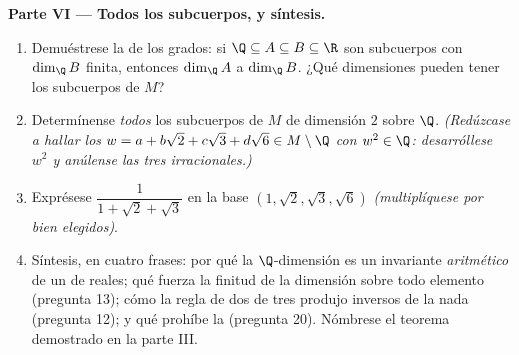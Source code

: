 \begin{problem}
\medskip
\noindent\textbf{Parte VI --- Todos los subcuerpos, y síntesis.}
\begin{enumerate}[resume]
  \item Demuéstrese la  de los grados: si
        $\Q \subseteq A \subseteq B \subseteq \R$ son subcuerpos con
        $\dim_\Q B$ finita, entonces $\dim_\Q A$  a
        $\dim_\Q B$. ¿Qué dimensiones pueden tener los subcuerpos de
        $M$?
  \item Determínense \emph{todos} los subcuerpos de $M$ de dimensión
        $2$ sobre $\Q$. \emph{(Redúzcase a hallar los $w = a +
        b\sqrt2 + c\sqrt3 + d\sqrt6 \in M \setminus \Q$ con
        $w^2 \in \Q$: desarróllese $w^2$ y anúlense las tres
         irracionales.)}
  \item Exprésese $\dfrac1{1 + \sqrt2 + \sqrt3}$ en la base
        $(1, \sqrt2, \sqrt3, \sqrt6)$ \emph{(multiplíquese por
         bien elegidos)}.
  \item Síntesis, en cuatro frases: por qué la $\Q$-dimensión es un
        invariante \emph{aritmético} de un  de reales; qué
        fuerza la finitud de la dimensión sobre todo elemento
        (pregunta 13); cómo la regla de dos de tres produjo inversos
        de la nada (pregunta 12); y qué prohíbe la 
        (pregunta 20). Nómbrese el teorema demostrado en la parte III.
\end{enumerate}
\end{problem}
